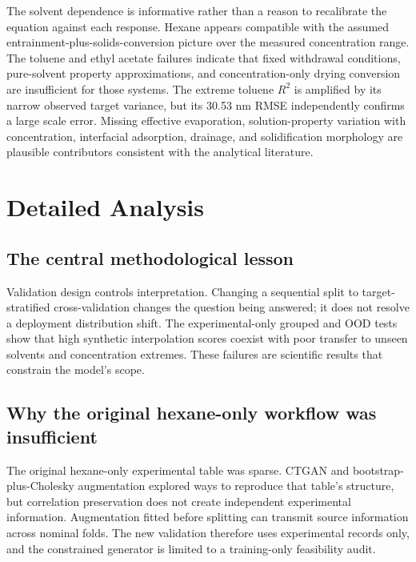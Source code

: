 \documentclass[11pt]{article}
\begin{document}
The solvent dependence is informative rather than a reason to recalibrate the equation against each response. Hexane appears compatible with the assumed entrainment-plus-solids-conversion picture over the measured concentration range. The toluene and ethyl acetate failures indicate that fixed withdrawal conditions, pure-solvent property approximations, and concentration-only drying conversion are insufficient for those systems. The extreme toluene $R^2$ is amplified by its narrow observed target variance, but its 30.53 nm RMSE independently confirms a large scale error. Missing effective evaporation, solution-property variation with concentration, interfacial adsorption, drainage, and solidification morphology are plausible contributors consistent with the analytical literature.





\section{Detailed Analysis}

\subsection{The central methodological lesson}
Validation design controls interpretation. Changing a sequential split to target-stratified cross-validation changes the question being answered; it does not resolve a deployment distribution shift. The experimental-only grouped and OOD tests show that high synthetic interpolation scores coexist with poor transfer to unseen solvents and concentration extremes. These failures are scientific results that constrain the model's scope.

\subsection{Why the original hexane-only workflow was insufficient}
The original hexane-only experimental table was sparse. CTGAN and bootstrap-plus-Cholesky augmentation explored ways to reproduce that table's structure, but correlation preservation does not create independent experimental information. Augmentation fitted before splitting can transmit source information across nominal folds. The new validation therefore uses experimental records only, and the constrained generator is limited to a training-only feasibility audit.
\end{document}
